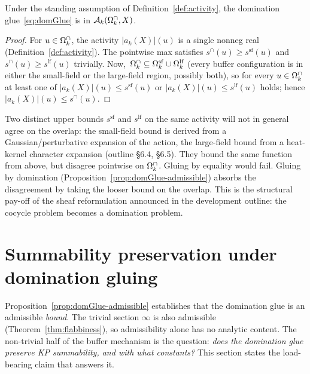 \begin{proposition}
\label{prop:domGlue-admissible}
Under the standing assumption of Definition~\ref{def:activity}, the domination glue~\eqref{eq:domGlue} is in $\mathcal{A}_k(\Omega_k^{\cap}, X)$.
\end{proposition}

\begin{proof}
For $u \in \Omega_k^{\cap}$, the activity $|a_k(X)|(u)$ is a single nonneg real (Definition~\ref{def:activity}).  The pointwise max satisfies $s^{\cap}(u) \ge s^{\mathrm{sf}}(u)$ and $s^{\cap}(u) \ge s^{\mathrm{lf}}(u)$ trivially.  Now,~$\Omega_k^{\cap} \subseteq \Omega_k^{\mathrm{sf}} \cup \Omega_k^{\mathrm{lf}}$ (every buffer configuration is in either the small-field or the large-field region, possibly both), so for every $u \in \Omega_k^{\cap}$ at least one of $|a_k(X)|(u) \le s^{\mathrm{sf}}(u)$ or $|a_k(X)|(u) \le s^{\mathrm{lf}}(u)$ holds; hence $|a_k(X)|(u) \le s^{\cap}(u)$.
\end{proof}

\begin{remark}
Two distinct upper bounds $s^{\mathrm{sf}}$ and $s^{\mathrm{lf}}$ on the same activity will not in general agree on the overlap: the small-field bound is derived from a Gaussian/perturbative expansion of the action, the large-field bound from a heat-kernel character expansion (outline \S6.4, \S6.5).  They bound the same function from above, but disagree pointwise on $\Omega_k^{\cap}$.  Gluing by equality would fail.  Gluing by domination (Proposition~\ref{prop:domGlue-admissible}) absorbs the disagreement by taking the looser bound on the overlap.  This is the structural pay-off of the sheaf reformulation announced in the development outline: the cocycle problem becomes a domination problem.
\end{remark}

\section{Summability preservation under domination gluing}
\label{sec:buffer-summability}

Proposition~\ref{prop:domGlue-admissible} establishes that the
domination glue is an admissible \emph{bound}.  The trivial section
$\infty$ is also admissible (Theorem~\ref{thm:flabbiness}), so
admissibility alone has no analytic content.  The non-trivial half
of the buffer mechanism is the question: \emph{does the domination
glue preserve KP summability, and with what constants?}  This
section states the load-bearing claim that answers it.

